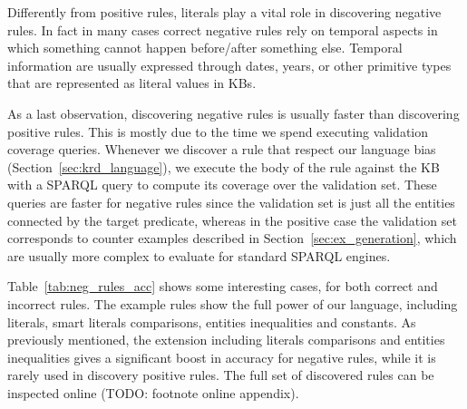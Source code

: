 Differently from positive rules, literals play a vital role in discovering negative rules. In fact in many cases correct negative rules rely on temporal aspects in which something cannot happen before/after something else. Temporal information are usually expressed through dates, years, or other primitive types that are represented as literal values in KBs.

As a last observation, discovering negative rules is usually faster than discovering positive rules. This is mostly due to the time we spend executing validation coverage queries. Whenever we discover a rule that respect our language bias (Section~\ref{sec:krd_language}), we execute the body of the rule against the KB with a SPARQL query to compute its coverage over the validation set. These queries are faster for negative rules since the validation set is just all the entities connected by the target predicate, whereas in the positive case the validation set corresponds to counter examples described in Section~\ref{sec:ex_generation}, which are usually more complex to evaluate for standard SPARQL engines.

Table~\ref{tab:neg_rules_acc} shows some interesting cases, for both correct and incorrect rules.
The example rules show the full power of our language, including literals, smart literals comparisons, entities inequalities and constants. As previously mentioned, the extension including literals comparisons and entities inequalities gives a significant boost in accuracy for negative rules, while it is rarely used in discovery positive rules. The full set of discovered rules can be inspected online (TODO: footnote online appendix).


